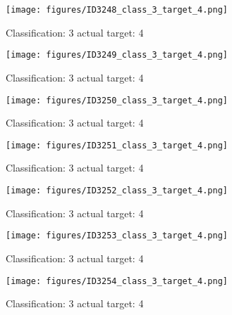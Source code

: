 \begin{figure}[h!]
\begin{center}
\texttt{[image: figures/ID3248\_class\_3\_target\_4.png]}
\end{center}
\caption{ Classification: 3 actual target: 4}
\label{fig:ID3248_class_3_target_4}
\end{figure}
\begin{figure}[h!]
\begin{center}
\texttt{[image: figures/ID3249\_class\_3\_target\_4.png]}
\end{center}
\caption{ Classification: 3 actual target: 4}
\label{fig:ID3249_class_3_target_4}
\end{figure}
\begin{figure}[h!]
\begin{center}
\texttt{[image: figures/ID3250\_class\_3\_target\_4.png]}
\end{center}
\caption{ Classification: 3 actual target: 4}
\label{fig:ID3250_class_3_target_4}
\end{figure}
\begin{figure}[h!]
\begin{center}
\texttt{[image: figures/ID3251\_class\_3\_target\_4.png]}
\end{center}
\caption{ Classification: 3 actual target: 4}
\label{fig:ID3251_class_3_target_4}
\end{figure}
\begin{figure}[h!]
\begin{center}
\texttt{[image: figures/ID3252\_class\_3\_target\_4.png]}
\end{center}
\caption{ Classification: 3 actual target: 4}
\label{fig:ID3252_class_3_target_4}
\end{figure}
\begin{figure}[h!]
\begin{center}
\texttt{[image: figures/ID3253\_class\_3\_target\_4.png]}
\end{center}
\caption{ Classification: 3 actual target: 4}
\label{fig:ID3253_class_3_target_4}
\end{figure}
\begin{figure}[h!]
\begin{center}
\texttt{[image: figures/ID3254\_class\_3\_target\_4.png]}
\end{center}
\caption{ Classification: 3 actual target: 4}
\label{fig:ID3254_class_3_target_4}
\end{figure}

